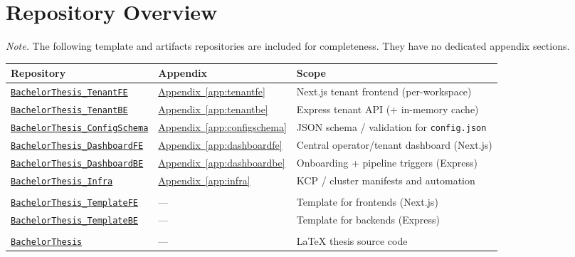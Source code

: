 \documentclass[11pt, a4paper, oneside, listof=totoc]{scrartcl}
\newcommand{\ghowner}{MysterionAutotronic}
\newcommand{\ghrepo}[1]{%
    \href{https://github.com/\ghowner/#1}{\nolinkurl{#1}}%
}
\DeclareRobustCommand{\appref}[1]{\hyperref[#1]{Appendix~\ref*{#1}}}
\begin{document}
    \cleardoublepage
    \appendix

        \section{Repository Overview}\label{app:repos-overview}
            \noindent\emph{Note.} The following template and artifacts repositories are included for
            completeness.
            They have no dedicated appendix sections.

            \begin{longtable}{@{}l l P{7.5cm}@{}}
                \toprule
                Repository & Appendix & Scope \\
                \midrule
                \ghrepo{BachelorThesis_TenantFE}     & \appref{app:tenantfe}     & Next.js tenant frontend (per-workspace) \\
                \ghrepo{BachelorThesis_TenantBE}     & \appref{app:tenantbe}     & Express tenant API (+ in-memory cache) \\
                \ghrepo{BachelorThesis_ConfigSchema} & \appref{app:configschema} & JSON schema / validation for \texttt{config.json} \\
                \ghrepo{BachelorThesis_DashboardFE}  & \appref{app:dashboardfe}  & Central operator/tenant dashboard (Next.js) \\
                \ghrepo{BachelorThesis_DashboardBE}  & \appref{app:dashboardbe}  & Onboarding + pipeline triggers (Express) \\
                \ghrepo{BachelorThesis_Infra}        & \appref{app:infra}        & KCP / cluster manifests and automation \\
                \addlinespace
                \\
                \ghrepo{BachelorThesis_TemplateFE}   & —                         & Template for frontends (Next.js) \\
                \ghrepo{BachelorThesis_TemplateBE}   & —                         & Template for backends (Express) \\
                \addlinespace
                \\
                \ghrepo{BachelorThesis}              & —                         & \LaTeX{} thesis source code \\
                \bottomrule
            \end{longtable}
\end{document}
